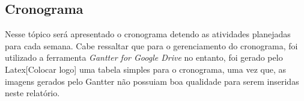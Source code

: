 \begin{landscape}
\chapter[Cronograma]{Cronograma}
\label{chap:cronograma}
	
	Nesse tópico será apresentado o cronograma detendo as atividades planejadas para cada semana. Cabe ressaltar que para o gerenciamento do cronograma, foi utilizado a ferramenta \emph{Gantter for Google Drive} no entanto, foi gerado pelo Latex[Colocar logo] uma tabela simples para o cronograma, uma vez que, as imagens gerados pelo Gantter não possuiam boa qualidade para serem inseridas neste relatório.
	

	\label{subsubsec:cronograma_table}
		\begin{table}[h]
			\centering
			\begin{tabular}{|p{7cm}|c|c|c|c|p{4cm}|c|}
				
				\hline
				

\end{tabular}
\end{table}
\end{landscape}
